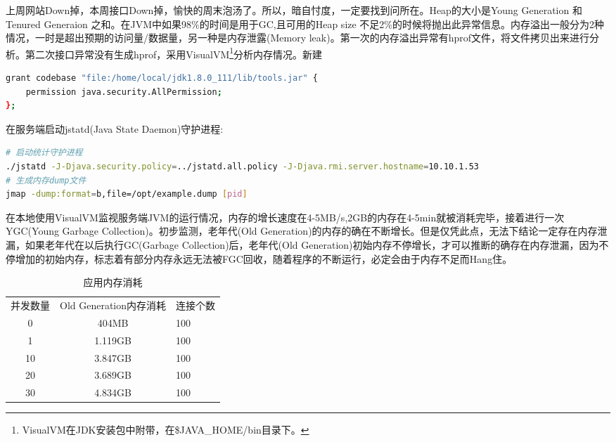\documentclass[8pt]{book}
\numberwithin{dummy}{section}
\theoremstyle{ocrenumbox}
\theoremstyle{blacknumex}
\theoremstyle{blacknumbox}
\theoremstyle{ocrenum}
\begin{document}
上周网站Down掉，本周接口Down掉，愉快的周末泡汤了。所以，暗自忖度，一定要找到问所在。Heap的大小是Young Generation 和Tenured Generaion 之和。在JVM中如果98\%的时间是用于GC,且可用的Heap size 不足2\%的时候将抛出此异常信息。内存溢出一般分为2种情况，一时是超出预期的访问量/数据量，另一种是内存泄露(Memory leak)。第一次的内存溢出异常有hprof文件，将文件拷贝出来进行分析。第二次接口异常没有生成hprof，采用VisualVM\footnote{VisualVM在JDK安装包中附带，在\$JAVA\_HOME/bin目录下。}分析内存情况。新建

\begin{lstlisting}[language=Bash]
grant codebase "file:/home/local/jdk1.8.0_111/lib/tools.jar" {   
	permission java.security.AllPermission;   
};
\end{lstlisting}

在服务端启动jstatd(Java State Daemon)守护进程:

\begin{lstlisting}[language=Bash]
# 启动统计守护进程
./jstatd -J-Djava.security.policy=../jstatd.all.policy -J-Djava.rmi.server.hostname=10.10.1.53
# 生成内存dump文件
jmap -dump:format=b,file=/opt/example.dump [pid]
\end{lstlisting}

在本地使用VisualVM监视服务端JVM的运行情况，内存的增长速度在4-5MB/s,2GB的内存在4-5min就被消耗完毕，接着进行一次YGC(Young Garbage Collection)。初步监测，老年代(Old Generation)的内存的确在不断增长。但是仅凭此点，无法下结论一定存在内存泄漏，如果老年代在以后执行GC(Garbage Collection)后，老年代(Old Generation)初始内存不停增长，才可以推断的确存在内存泄漏，因为不停增加的初始内存，标志着有部分内存永远无法被FGC回收，随着程序的不断运行，必定会由于内存不足而Hang住。

\begin{table}[htbp]
	\caption{应用内存消耗}
	\label{table:appmemoryusing}
	\begin{center}
		\begin{tabular}{|c|c|p{2cm}|}
			\hline
			\multirow{1}{*}{并发数量}
			& \multicolumn{1}{c|}{Old Generation内存消耗} 
			& \multicolumn{1}{c|}{连接个数}\\			
			\cline{1-3}
			0 &  404MB  & 100 \\
			\hline
			1 &  1.119GB  & 100 \\
			\hline
			10 &  3.847GB  & 100 \\
			\hline
			20 &  3.689GB  & 100 \\
			\hline
			30 &  4.834GB  & 100 \\
			\hline											
		\end{tabular}	
	\end{center}
\end{table}
\end{document}
